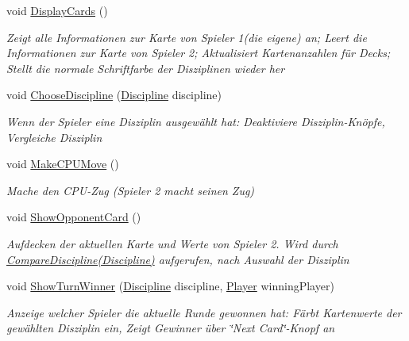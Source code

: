\begin{DoxyCompactItemize}
void \mbox{\hyperlink{class_main_window_ac527beb2a3d814c60578bd415c589dcf}{Display\+Cards}} ()
\begin{DoxyCompactList}\small\item\em Zeigt alle Informationen zur Karte von Spieler 1(die eigene) an; Leert die Informationen zur Karte von Spieler 2; Aktualisiert Kartenanzahlen für Decks; Stellt die normale Schriftfarbe der Disziplinen wieder her \end{DoxyCompactList}\item 
void \mbox{\hyperlink{class_main_window_ab0f20d9b5a33f6469d5b837799e534fc}{Choose\+Discipline}} (\mbox{\hyperlink{namespace_poke_quet_aa425f1b8cf90847021fe1177d6a7199d}{Discipline}} discipline)
\begin{DoxyCompactList}\small\item\em Wenn der Spieler eine Disziplin ausgewählt hat\+: Deaktiviere Disziplin-\/\+Knöpfe, Vergleiche Disziplin \end{DoxyCompactList}\item 
void \mbox{\hyperlink{class_main_window_a25b45e71a3e8fc76ab004cf4c9725c66}{Make\+C\+P\+U\+Move}} ()
\begin{DoxyCompactList}\small\item\em Mache den C\+P\+U-\/\+Zug (Spieler 2 macht seinen Zug) \end{DoxyCompactList}\item 
void \mbox{\hyperlink{class_main_window_a635fb220648803e533830c65bbe29fd8}{Show\+Opponent\+Card}} ()
\begin{DoxyCompactList}\small\item\em Aufdecken der aktuellen Karte und Werte von Spieler 2. Wird durch \mbox{\hyperlink{class_main_window_a4bbff733cfab680758c3fcc80a0de055}{Compare\+Discipline(\+Discipline)}} aufgerufen, nach Auswahl der Disziplin \end{DoxyCompactList}\item 
void \mbox{\hyperlink{class_main_window_aa29917f24b4b216e576a90b000db089d}{Show\+Turn\+Winner}} (\mbox{\hyperlink{namespace_poke_quet_aa425f1b8cf90847021fe1177d6a7199d}{Discipline}} discipline, \mbox{\hyperlink{class_poke_quet_1_1_player}{Player}} winning\+Player)
\begin{DoxyCompactList}\small\item\em Anzeige welcher Spieler die aktuelle Runde gewonnen hat\+: Färbt Kartenwerte der gewählten Disziplin ein, Zeigt Gewinner über \char`\"{}\+Next Card\char`\"{}-\/\+Knopf an \end{DoxyCompactList}\item 

\end{DoxyCompactItemize}
